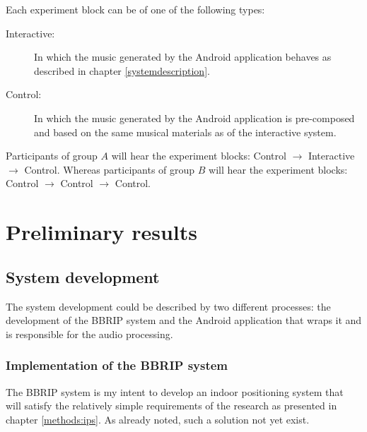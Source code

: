 \documentclass[a4paper,11pt]{article}
\begin{document}
Each experiment block can be of one of the following types:
\begin{description}
	\item[Interactive:] In which the music generated by the Android application behaves as described in chapter \ref{systemdescription}.
	\item[Control:] In which the music generated by the Android application is pre-composed and based on the same musical materials as of the interactive system.
\end{description}

Participants of group $A$ will hear the experiment blocks: Control $\rightarrow$ Interactive $\rightarrow$ Control. Whereas participants of group $B$ will hear the experiment blocks: Control $\rightarrow$ Control $\rightarrow$ Control.


\section{Preliminary results}

\subsection{System development}

The system development could be described by two different processes: the development of the BBRIP system and the Android application that wraps it and is responsible for the audio processing.

\subsubsection{Implementation of the BBRIP system}

The BBRIP system is my intent to develop an indoor positioning system that will satisfy the relatively simple requirements of the research as presented in chapter \ref{methods:ips}.
As already noted, such a solution not yet exist.
\end{document}

